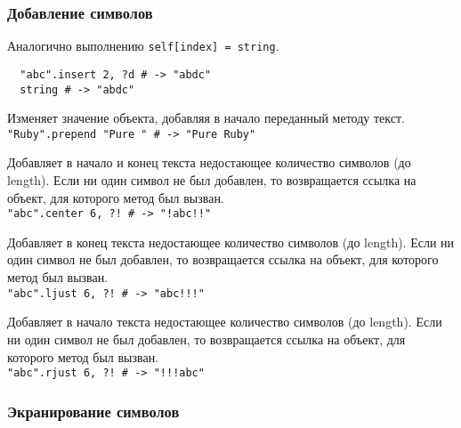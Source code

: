 \subsubsection*{Добавление символов}

\begin{methodlist}
  Аналогично выполнению \verb!self[index] = string!.
  \begin{verbatim}
  "abc".insert 2, ?d # -> "abdc"
  string # -> "abdc"
  \end{verbatim}

  Изменяет значение объекта, добавляя в начало переданный методу текст.
  \\\verb!"Ruby".prepend "Pure " # -> "Pure Ruby"!

  Добавляет в начало и конец текста недостающее количество символов (до length). Если ни один символ не был добавлен, то возвращается ссылка на объект, для которого метод был вызван.
  \\\verb|"abc".center 6, ?! # -> "!abc!!"|

  Добавляет в конец текста недостающее количество символов (до length). Если ни один символ не был добавлен, то возвращается ссылка на объект, для которого метод был вызван.
  \\\verb|"abc".ljust 6, ?! # -> "abc!!!"|

  Добавляет в начало текста недостающее количество символов (до length). Если ни один символ не был добавлен, то возвращается ссылка на объект, для которого метод был вызван.
  \\\verb|"abc".rjust 6, ?! # -> "!!!abc"|
\end{methodlist}

\subsubsection*{Экранирование символов}

